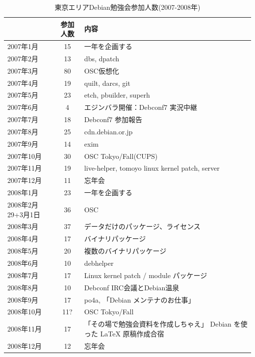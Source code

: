 \documentclass[mingoth,a4paper]{jsarticle}
\begin{document}
\begin{table}[ht]
\begin{minipage}{0.5\hsize}
 \caption{東京エリアDebian勉強会参加人数(2007-2008年)}\label{tab:count2007}
 \begin{center}
  \begin{tabular}{|l|c|p{10em}|}
 \hline
 & 参加人数 & 内容\\
 \hline
   2007年1月 & 15 & 一年を企画する \\
   2007年2月 & 13 & dbs, dpatch\\ 
   2007年3月 & 80 & OSC仮想化 \\
   2007年4月 & 19 & quilt, darcs, git\\
   2007年5月 & 23 & etch, pbuilder, superh \\   
   2007年6月 & 4 & エジンバラ開催：Debconf7 実況中継 \\
   2007年7月 & 18 & Debconf7 参加報告\\
   2007年8月 & 25 & cdn.debian.or.jp \\   
   2007年9月 & 14 & exim \\   
   2007年10月 & 30 & OSC Tokyo/Fall(CUPS) \\   
   2007年11月 & 19 & live-helper, tomoyo linux kernel patch, server\\
   2007年12月 & 11 & 忘年会\\
   2008年1月 & 23 & 一年を企画する \\
   2008年2月29+3月1日 & 36 & OSC  \\
   2008年3月 & 37 & データだけのパッケージ、ライセンス \\
   2008年4月 & 17 & バイナリパッケージ \\
   2008年5月 & 20 & 複数のバイナリパッケージ \\
   2008年6月 & 10 & debhelper \\
   2008年7月 & 17 & Linux kernel patch / module パッケージ \\
   2008年8月 & 10 & Debconf IRC会議とDebian温泉 \\
   2008年9月 & 17 & po4a, 「Debian メンテナのお仕事」 \\
   2008年10月 & 11? & OSC Tokyo/Fall \\
   2008年11月 & 17 & 「その場で勉強会資料を作成しちゃえ」 Debian を使った \LaTeX{} 原稿作成合宿 \\
   2008年12月 & 12 & 忘年会 \\
 \hline
  \end{tabular}
 \end{center}
\end{minipage}
\end{table}
\end{document}
